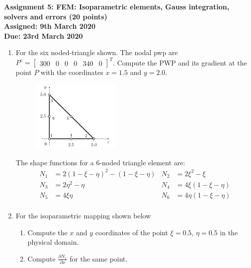 \documentclass[a4paper,12pt]{article}
\begin{document}
\begin{centering}
	\textbf{
		Assignment 5: FEM: Isoparametric elements, Gauss integration, solvers and errors (20 points)\\
		Assigned: 9th March 2020\\
		Due: 23rd March 2020\\
	}
\end{centering}

\vspace{1em}
 
\begin{enumerate}

	\item For the six noded-triangle shown. The nodal pwp are $P^e = \begin{bmatrix}300 & 0 & 0 & 0 & 340 & 0 \end{bmatrix}^T$. Compute the PWP and its gradient at the point $P$ with the coordinates $x = 1.5$ and $y = 2.0$.

		
		\begin{figure}[!h]
			\centering
			\includegraphics[width=0.4\textwidth]{figs/6noded-triangle.png}
		\end{figure}

	The shape functions for a 6-noded triangle element are:
	\begin{align*}
	N_1 & = 2(1-\xi -\eta)^2 - (1 -\xi -\eta) & N_2 & = 2\xi^2 -\xi\\
	N_3 & = 2\eta^2 -\eta & N_4 & = 4\xi(1 - \xi - \eta)\\
	N_5 & = 4\xi\eta & N_6 & = 4 \eta(1 - \xi - \eta)\\
	\end{align*}
	
	\item For the isoparametric mapping shown below
		\begin{enumerate}
			\item Compute the $x$ and $y$ coordinates of the point $\xi = 0.5$, $\eta = 0.5$ in the physical domain.
			\item Compute $\frac{\partial N_1}{\partial x}$ for the same point.
		\end{enumerate}
		

\end{enumerate}
\end{document}
